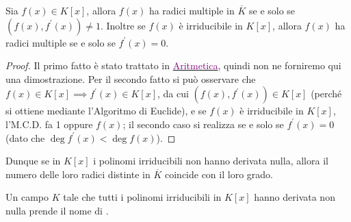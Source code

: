 \documentclass[11pt]{scrartcl}
\begin{document}
\begin{theorem}
	\label{derivata}
	Sia $f(x) \in K[x]$, allora $f(x)$ ha radici multiple in $\overline K$ se e solo se $(f(x),f^{\prime}(x)) \ne 1$. 
	Inoltre se $f(x)$ è irriducibile in $K[x]$, allora $f(x)$ ha radici multiple se e solo se $f^{\prime}(x) = 0$.
\end{theorem}

\begin{proof}
    Il primo fatto è stato trattato in \href{https://github.com/diego-unipi/Appunti-Aritmetica}{\textcolor{purple}{Aritmetica}}, quindi non ne forniremo qui una dimostrazione. Per il secondo fatto si può osservare che $f(x) \in K[x] \implies f^{\prime}(x) \in K[x]$,
    da cui $(f(x),f^{\prime}(x)) \in K[x]$ (perché si ottiene mediante l'Algoritmo di Euclide), e se $f(x)$ è irriducibile in $K[x]$, l'M.C.D. fa 1 oppure $f(x)$; 
    il secondo caso si realizza se e solo se $f^{\prime}(x) = 0$ (dato che $\deg f^{\prime}(x) < \deg f(x)$).
\end{proof}

Dunque se in $K[x]$ i polinomi irriducibili non hanno derivata nulla, allora il numero delle loro radici distinte in $\overline K$ coincide con il loro grado.

\begin{definition}
    Un campo $K$ tale che tutti i polinomi irriducibili in $K[x]$ hanno derivata non nulla prende il nome di .
\end{definition}
\end{document}
